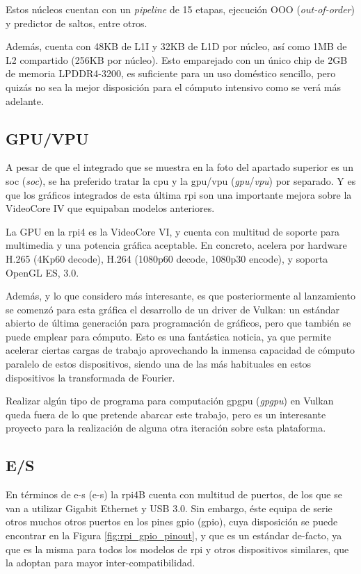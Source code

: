 Estos núcleos cuentan con un \textit{pipeline} de 15 etapas, ejecución OOO (\textit{out-of-order}) y predictor de saltos, entre otros.

Además, cuenta con 48KB de L1I y 32KB de L1D por núcleo, así como 1MB de L2 compartido (256KB por núcleo). Esto emparejado con un único chip de 2GB de memoria LPDDR4-3200, es suficiente para un uso doméstico sencillo, pero quizás no sea la mejor disposición para el cómputo intensivo como se verá más adelante.

\subsection{GPU/VPU}
\label{ssec:gpu_vpu}
A pesar de que el integrado que se muestra en la foto del apartado superior es un \acrshort{soc} (\textit{\acrlong{soc}}), se ha preferido tratar la \acrshort{cpu} y la \acrshort{gpu}/\acrshort{vpu} (\textit{\acrlong{gpu}}/\textit{\acrlong{vpu}}) por separado. Y es que los gráficos integrados de esta última \acrlong{rpi} son una importante mejora sobre la VideoCore IV que equipaban modelos anteriores.

La GPU en la \acrshort{rpi}4 es la VideoCore VI, y cuenta con multitud de soporte para multimedia y una potencia gráfica aceptable. En concreto, acelera por hardware H.265 (4Kp60 decode), H.264 (1080p60 decode, 1080p30 encode), y soporta OpenGL ES, 3.0.

Además, y lo que considero más interesante, es que posteriormente al lanzamiento se comenzó para esta gráfica el desarrollo de un driver de Vulkan: un estándar abierto de última generación para programación de gráficos, pero que también se puede emplear para cómputo. Esto es una fantástica noticia, ya que permite acelerar ciertas cargas de trabajo aprovechando la inmensa capacidad de cómputo paralelo de estos dispositivos, siendo una de las más habituales en estos dispositivos la transformada de Fourier.

Realizar algún tipo de programa para computación \acrshort{gpgpu} (\textit{\acrlong{gpgpu}}) en Vulkan queda fuera de lo que pretende abarcar este trabajo, pero es un interesante proyecto para la realización de alguna otra iteración sobre esta plataforma.

\subsection{E/S}
En términos de \acrlong{e-s} (\acrshort{e-s}) la \acrshort{rpi}4B cuenta con multitud de puertos, de los que se van a utilizar Gigabit Ethernet y USB 3.0. Sin embargo, éste equipa de serie otros muchos otros puertos en los pines \acrshort{gpio} (\acrlong{gpio}), cuya disposición se puede encontrar en la Figura \ref{fig:rpi_gpio_pinout}, y que es un estándar de-facto, ya que es la misma para todos los modelos de \acrlong{rpi} y otros dispositivos similares, que la adoptan para mayor inter-compatibilidad.

